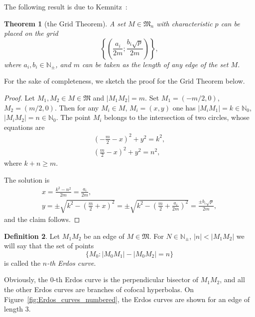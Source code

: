\documentclass[a4paper,14pt]{article} %
\theoremstyle{plain}
\newtheorem{theorem}{Theorem}[section]
\theoremstyle{definition}
\newtheorem{definition}[theorem]{Definition}
\begin{document}
The following result is due to Kemnitz~\cite{kemnitz1988punktmengen}:

\begin{theorem}[the Grid Theorem]
	A set $M \in \mathfrak{M}_n$ with characteristic $p$ can be placed on the grid
	$$
	\left\{\left(\frac{a_i}{2m} ; \frac{b_i \sqrt{p}}{2m}\right)\right\},
	$$
	where $a_i, b_i \in \mathbb{N}_\pm$, and $m$ can be taken as the length of any edge of the set $M$.
	\label{tm:1}
\end{theorem}

For the sake of completeness, we sketch the proof for the Grid Theorem below.

\begin{proof}
	Let $M_1, M_2 \in M \in \mathfrak M$ and $|M_1 M_2| = m$.
	Set $M_1=(-m/2, 0)$, $M_2=(m/2, 0)$.
	Then for any $M_i \in M$, $M_i = (x,y)$ one has
	$|M_i M_1| = k \in \mathbb N_0$, $|M_i M_2| = n \in \mathbb N_0$.
	The point $M_i$ belongs to the intersection of two circles,
	whose equations are
	\begin{gather}
		\left(-\frac{m}{2} - x\right)^2 + y ^2 = k^2,
	\\
		\left( \frac{m}{2} - x\right)^2 + y ^2 = n^2,
	\end{gather}
	where $k+n\geq m$.

	The solution is
	\begin{gather}
		x = \frac{k^2 - n^2}{2 m} = \frac{a_i}{2m},
	\\
		y = \pm\sqrt{k^2 - \left(\frac{m}{2}+x\right)^2} =
		\pm\sqrt{k^2 - \left(\frac{m}{2}+\frac{a_i}{2m}\right)^2} =
		\frac{\pm b_i \sqrt{p}}{2m},
	\end{gather}
	and the claim follows.
\end{proof}

\begin{definition}
	Let $M_1 M_2$ be an edge of $M\in \mathfrak{M}$.
	For $N\in\mathbb N_\pm$, $|n| < |M_1 M_2|$
	we will say that the set of points
	\begin{equation}
		\{M_0 : |M_0 M_1| - |M_0 M_2| = n\}
	\end{equation}
	is called the \emph{$n$-th Erdos curve}.
\end{definition}

Obviously, the 0-th Erdos curve is the perpendicular bisector of $M_1 M_2$,
and all the other Erdos curves are branches of cofocal hyperbolas.
On Figure~\ref{fig:Erdos_curves_numbered}, the Erdos curves are shown for an edge of length 3.
\end{document}
